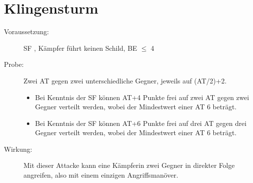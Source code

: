 \section{Klingensturm}
\label{aktion.klingensturm}
\begin{description}
    \item[Voraussetzung:]
        SF , Kämpfer führt keinen Schild, BE\textrm{ ${\leq}$ }4
    \item[Probe:]
        Zwei AT gegen zwei unterschiedliche Gegner, jeweils auf (AT/2)+2.
        \begin{itemize}
            \item Bei Kenntnis der SF  können AT+4 Punkte frei auf zwei AT gegen zwei Gegner verteilt werden, wobei der Mindestwert einer AT 6 beträgt.
            \item Bei Kenntnis der SF  können AT+6 Punkte frei auf drei AT gegen drei Gegner verteilt werden, wobei der Mindestwert einer AT 6 beträgt.
        \end{itemize}
    \item[Wirkung:]
        Mit dieser Attacke kann eine Kämpferin zwei Gegner in direkter Folge angreifen, also mit einem einzigen Angriffsmanöver.
\end{description}
